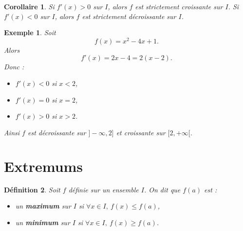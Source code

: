 \documentclass[11pt,a4paper]{article}
\newtheorem{definition}{Définition}[section]
\newtheorem{corollaire}[definition]{Corollaire}
\newtheorem*{exemple}{Exemple}
\begin{document}

\begin{corollaire}
Si \(f'(x)>0\) sur \(I\), alors \(f\) est strictement croissante sur \(I\).  
Si \(f'(x)<0\) sur \(I\), alors \(f\) est strictement décroissante sur \(I\).
\end{corollaire}

\begin{exemple}
Soit
\[
f(x)=x^2-4x+1.
\]
Alors
\[
f'(x)=2x-4=2(x-2).
\]
Donc :
\begin{itemize}
    \item \(f'(x)<0\) si \(x<2\),
    \item \(f'(x)=0\) si \(x=2\),
    \item \(f'(x)>0\) si \(x>2\).
\end{itemize}
Ainsi \(f\) est décroissante sur \(]-\infty,2]\) et croissante sur \([2,+\infty[\).
\end{exemple}

\section{Extremums}

\begin{definition}
Soit \(f\) définie sur un ensemble \(I\). On dit que \(f(a)\) est :
\begin{itemize}
    \item un \textbf{maximum} sur \(I\) si \(\forall x\in I,\ f(x)\le f(a)\),
    \item un \textbf{minimum} sur \(I\) si \(\forall x\in I,\ f(x)\ge f(a)\).
\end{itemize}
\end{definition}
\end{document}
